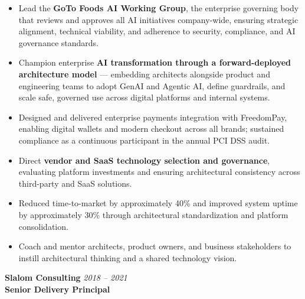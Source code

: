 \documentclass[11pt]{article}
\begin{document}
\begin{itemize}
  \item Lead the \textbf{GoTo Foods AI Working Group}, the enterprise governing body that reviews and approves all AI initiatives company-wide, ensuring strategic alignment, technical viability, and adherence to security, compliance, and AI governance standards.
  \item Champion enterprise \textbf{AI transformation through a forward-deployed architecture model} --- embedding architects alongside product and engineering teams to adopt GenAI and Agentic AI, define guardrails, and scale safe, governed use across digital platforms and internal systems.
  \item Designed and delivered enterprise payments integration with FreedomPay, enabling digital wallets and modern checkout across all brands; sustained compliance as a continuous participant in the annual PCI DSS audit.
  \item Direct \textbf{vendor and SaaS technology selection and governance}, evaluating platform investments and ensuring architectural consistency across third-party and SaaS solutions.
  \item Reduced time-to-market by approximately 40\% and improved system uptime by approximately 30\% through architectural standardization and platform consolidation.
  \item Coach and mentor architects, product owners, and business stakeholders to instill architectural thinking and a shared technology vision.
\end{itemize}

\vspace{6pt}

\textbf{Slalom Consulting} \hfill \textit{2018 -- 2021} \\
\textbf{Senior Delivery Principal}
\end{document}
